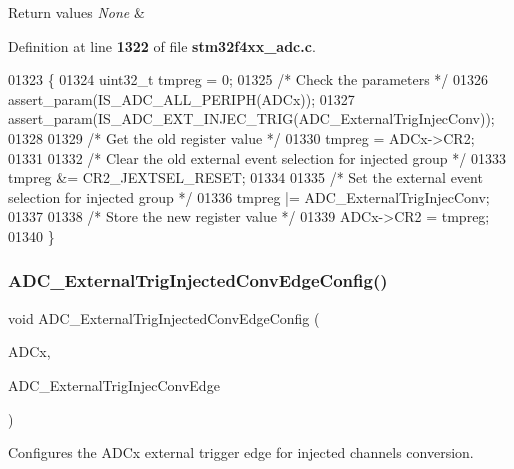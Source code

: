 \begin{DoxyRetVals}{Return values}
{\em None} & \\
\hline
\end{DoxyRetVals}


Definition at line \textbf{ 1322} of file \textbf{ stm32f4xx\+\_\+adc.\+c}.


\begin{DoxyCode}
01323 \{
01324   uint32\_t tmpreg = 0;
01325   \textcolor{comment}{/* Check the parameters */}
01326   assert_param(IS_ADC_ALL_PERIPH(ADCx));
01327   assert_param(IS_ADC_EXT_INJEC_TRIG(ADC\_ExternalTrigInjecConv));
01328   
01329   \textcolor{comment}{/* Get the old register value */}
01330   tmpreg = ADCx->CR2;
01331   
01332   \textcolor{comment}{/* Clear the old external event selection for injected group */}
01333   tmpreg &= CR2_JEXTSEL_RESET;
01334   
01335   \textcolor{comment}{/* Set the external event selection for injected group */}
01336   tmpreg |= ADC\_ExternalTrigInjecConv;
01337   
01338   \textcolor{comment}{/* Store the new register value */}
01339   ADCx->CR2 = tmpreg;
01340 \}
\end{DoxyCode}
\mbox{\label{group__ADC__Group6_ga62bea56579f04374fbe830d9e55e6fb0}} 
\subsubsection{A\+D\+C\+\_\+\+External\+Trig\+Injected\+Conv\+Edge\+Config()}
{\footnotesize\ttfamily void A\+D\+C\+\_\+\+External\+Trig\+Injected\+Conv\+Edge\+Config (\begin{DoxyParamCaption}\item[{\textbf{ A\+D\+C\+\_\+\+Type\+Def} $\ast$}]{A\+D\+Cx,  }\item[{uint32\+\_\+t}]{A\+D\+C\+\_\+\+External\+Trig\+Injec\+Conv\+Edge }\end{DoxyParamCaption})}



Configures the A\+D\+Cx external trigger edge for injected channels conversion. 



